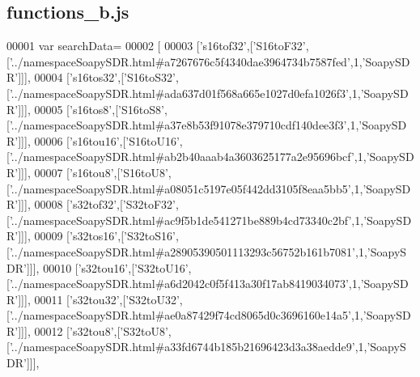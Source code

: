 \subsection{functions\+\_\+b.\+js}
\label{functions__b_8js_source}

\begin{DoxyCode}
00001 var searchData=
00002 [
00003   [\textcolor{stringliteral}{'s16tof32'},[\textcolor{stringliteral}{'S16toF32'},[\textcolor{stringliteral}{'../namespaceSoapySDR.html#a7267676c5f4340dae3964734b7587fed'},1,\textcolor{stringliteral}{'SoapySDR'}]]],
00004   [\textcolor{stringliteral}{'s16tos32'},[\textcolor{stringliteral}{'S16toS32'},[\textcolor{stringliteral}{'../namespaceSoapySDR.html#ada637d01f568a665e1027d0efa1026f3'},1,\textcolor{stringliteral}{'SoapySDR'}]]],
00005   [\textcolor{stringliteral}{'s16tos8'},[\textcolor{stringliteral}{'S16toS8'},[\textcolor{stringliteral}{'../namespaceSoapySDR.html#a37e8b53f91078e379710cdf140dee3f3'},1,\textcolor{stringliteral}{'SoapySDR'}]]],
00006   [\textcolor{stringliteral}{'s16tou16'},[\textcolor{stringliteral}{'S16toU16'},[\textcolor{stringliteral}{'../namespaceSoapySDR.html#ab2b40aaab4a3603625177a2e95696bcf'},1,\textcolor{stringliteral}{'SoapySDR'}]]],
00007   [\textcolor{stringliteral}{'s16tou8'},[\textcolor{stringliteral}{'S16toU8'},[\textcolor{stringliteral}{'../namespaceSoapySDR.html#a08051c5197e05f442dd3105f8eaa5bb5'},1,\textcolor{stringliteral}{'SoapySDR'}]]],
00008   [\textcolor{stringliteral}{'s32tof32'},[\textcolor{stringliteral}{'S32toF32'},[\textcolor{stringliteral}{'../namespaceSoapySDR.html#ac9f5b1de541271be889b4cd73340c2bf'},1,\textcolor{stringliteral}{'SoapySDR'}]]],
00009   [\textcolor{stringliteral}{'s32tos16'},[\textcolor{stringliteral}{'S32toS16'},[\textcolor{stringliteral}{'../namespaceSoapySDR.html#a28905390501113293c56752b161b7081'},1,\textcolor{stringliteral}{'SoapySDR'}]]],
00010   [\textcolor{stringliteral}{'s32tou16'},[\textcolor{stringliteral}{'S32toU16'},[\textcolor{stringliteral}{'../namespaceSoapySDR.html#a6d2042c0f5f413a30f17ab8419034073'},1,\textcolor{stringliteral}{'SoapySDR'}]]],
00011   [\textcolor{stringliteral}{'s32tou32'},[\textcolor{stringliteral}{'S32toU32'},[\textcolor{stringliteral}{'../namespaceSoapySDR.html#ae0a87429f74cd8065d0c3696160e14a5'},1,\textcolor{stringliteral}{'SoapySDR'}]]],
00012   [\textcolor{stringliteral}{'s32tou8'},[\textcolor{stringliteral}{'S32toU8'},[\textcolor{stringliteral}{'../namespaceSoapySDR.html#a33fd6744b185b21696423d3a38aedde9'},1,\textcolor{stringliteral}{'SoapySDR'}]]],

\end{DoxyCode}
